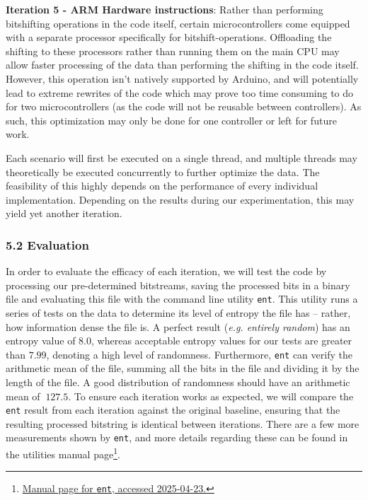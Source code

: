 \documentclass{sigchi}
\begin{document}
\textbf{Iteration 5 - ARM Hardware instructions}: Rather than performing bitshifting operations in the code itself, certain microcontrollers come equipped with a separate processor specifically for bitshift-operations. Offloading the shifting to these processors rather than running them on the main CPU may allow faster processing of the data than performing the shifting in the code itself. However, this operation isn't natively supported by Arduino, and will potentially lead to extreme rewrites of the code which may prove too time consuming to do for two microcontrollers (as the code will not be reusable between controllers). As such, this optimization may only be done for one controller or left for future work.

Each scenario will first be executed on a single thread, and multiple threads may theoretically be executed concurrently to further optimize the data. The feasibility of this highly depends on the performance of every individual implementation. Depending on the results during our experimentation, this may yield yet another iteration.

\subsubsection{5.2 Evaluation}\label{evaluation}

In order to evaluate the efficacy of each iteration, we will test the code by processing our pre-determined bitstreams, saving the processed bits in a binary file and evaluating this file with the command line utility \texttt{ent}. This utility runs a series of tests on the data to determine its level of entropy the file has -- rather, how information dense the file is. A perfect result (\emph{e.g. entirely random}) has an entropy value of \(8.0\), whereas acceptable entropy values for our tests are greater than \(7.99\), denoting a high level of randomness. Furthermore, \texttt{ent} can verify the arithmetic mean of the file, summing all the bits in the file and dividing it by the length of the file. A good distribution of randomness should have an arithmetic mean of \(~127.5\). To ensure each iteration works as expected, we will compare the \texttt{ent} result from each iteration against the original baseline, ensuring that the resulting processed bitstring is identical between iterations. There are a few more measurements shown by \texttt{ent}, and more details regarding these can be found in the utilities manual page\footnote{\href{https://manpages.ubuntu.com/manpages/trusty/man1/ent.1.html}{Manual page for \texttt{ent}, accessed 2025-04-23.}}.
\end{document}
